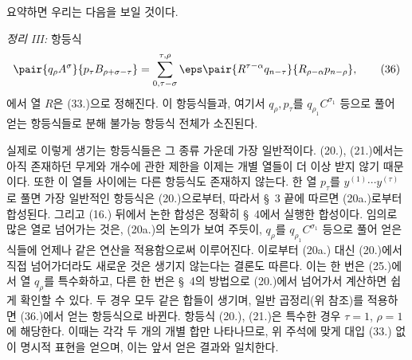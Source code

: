 
요약하면 우리는 다음을 보일 것이다.

\emph{정리 III:} 항등식
\begin{equation}
 \pair{q_\rho A^\sigma}{p_\tau B_{\rho+\sigma-\tau}}
 =\sum_{\substack{0,\tau-\sigma}}^{\substack{\tau,\rho}}
 \eps\pair{R^{\tau-\alpha}q_{n-\tau}}{R_{\rho-\alpha}p_{n-\rho}},
\tag{36}
\end{equation}
에서 열 $R$은 (33.)으로 정해진다. 이 항등식들과, 여기서 $q_\rho,p_\tau$를 $q_{\rho_1}C^{\sigma_1}$ 등으로 풀어 얻는 항등식들로 분해 불가능 항등식 전체가 소진된다.

실제로 이렇게 생기는 항등식들은 그 종류 가운데 가장 일반적이다. (20.), (21.)에서는 아직 존재하던 무게와 개수에 관한 제한을 이제는 개별 열들이 더 이상 받지 않기 때문이다. 또한 이 열들 사이에는 다른 항등식도 존재하지 않는다. 한 열 $p_\tau$를 $y^{(1)}\cdots y^{(\tau)}$로 풀면 가장 일반적인 항등식은 (20.)으로부터, 따라서 \S\ 3 끝에 따르면 (20a.)로부터 합성된다. 그리고 (16.) 뒤에서 논한 합성은 정확히 \S\ 4에서 실행한 합성이다. 임의로 많은 열로 넘어가는 것은, (20a.)의 논의가 보여 주듯이, $q_\rho$를 $q_{\rho_1}C^{\sigma_1}$ 등으로 풀어 얻은 식들에 언제나 같은 연산을 적용함으로써 이루어진다. 이로부터 (20a.) 대신 (20.)에서 직접 넘어가더라도 새로운 것은 생기지 않는다는 결론도 따른다. 이는 한 번은 (25.)에서 열 $q_\rho$를 특수화하고, 다른 한 번은 \S\ 4의 방법으로 (20.)에서 넘어가서 계산하면 쉽게 확인할 수 있다. 두 경우 모두 같은 합들이 생기며, 일반 곱정리(위 참조)를 적용하면 (36.)에서 얻는 항등식으로 바뀐다. 항등식 (20.), (21.)은 특수한 경우 $\tau=1$, $\rho=1$에 해당한다. 이때는 각각 두 개의 개별 합만 나타나므로, 위 주석에 맞게 대입 (33.) 없이 명시적 표현을 얻으며, 이는 앞서 얻은 결과와 일치한다.
